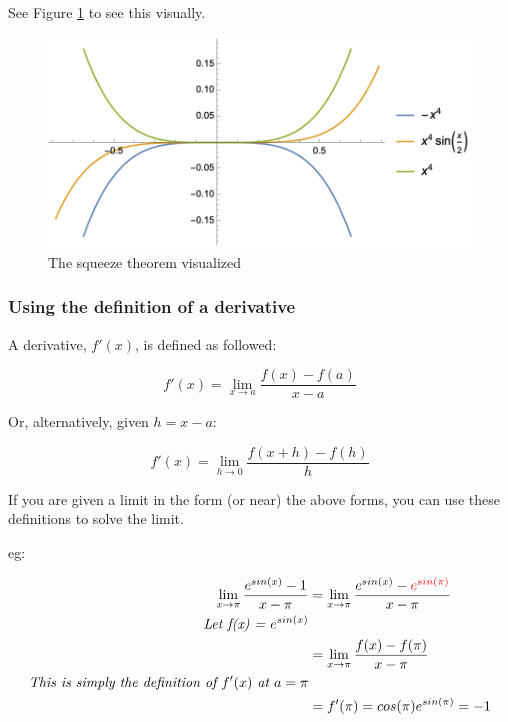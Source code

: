 \documentclass[12pt]{article}
\begin{document}
See Figure \ref{squeeze} to see this visually.

\begin{figure}[!ht]
    \centering
    \includegraphics[width=12.0cm]{misc/squeezetheorem.png}
    \caption{The squeeze theorem visualized}
    \label{squeeze}
\end{figure}

\subsubsection{Using the definition of a derivative}

A derivative, $f'(x)$, is defined as followed:

$$f'(x) = \lim_{x\to a}\frac{f(x)-f(a)}{x-a}$$

Or, alternatively, given $h = x-a$:

$$f'(x) = \lim_{h\to 0} \frac{f(x+h)-f(h)}{h}$$

If you are given a limit in the form (or near) the above forms, you can use these definitions to solve the limit. 

eg: 

\begin{equation}
    \begin{split}
    \lim_{x\to \pi}\frac{e^{sin(x)} - 1}{x - \pi} &= \lim_{x\to \pi}\frac{e^{sin(x)} - \textcolor{red}{e^{sin(\pi)}}}{x - \pi}\\
    \textit{Let f(x) = $e^{sin(x)}$}\\
    &=\lim_{x\to \pi}\frac{f(x)-f(\pi)}{x - \pi}\\
    \textit{This is simply the definition of $f'(x)$ at $a=\pi$}\\
    &=f'(\pi) = cos(\pi)e^{sin(\pi)} = -1
    \end{split}
\end{equation}
\end{document}
